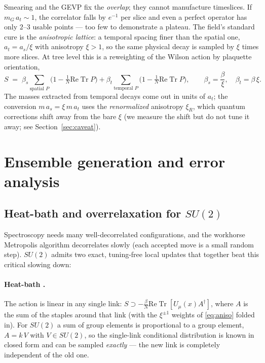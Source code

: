 \documentclass[11pt,a4paper]{article}
\newcommand{\Tr}{\operatorname{Tr}}
\newcommand{\at}{a_t}
\newcommand{\as}{a_s}
\begin{document}
Smearing and the GEVP fix the \emph{overlap}; they cannot manufacture
timeslices. If $m_G\, \at \sim 1$, the correlator falls by $e^{-1}$ per slice
and even a perfect operator has only $2$--$3$ usable points --- too few to
demonstrate a plateau. The field's standard cure
\cite{MorningstarPeardon1999} is the \emph{anisotropic lattice}: a temporal
spacing finer than the spatial one, $\at = \as/\xi$ with anisotropy
$\xi>1$, so the same physical decay is sampled by $\xi$ times more slices.
At tree level this is a reweighting of the Wilson action by plaquette
orientation,
\begin{equation}
  S \;=\; \beta_s \!\!\sum_{\text{spatial } P}\!\!
        \Big(1-\tfrac1N \mathrm{Re}\Tr P\Big)
      + \beta_t \!\!\sum_{\text{temporal } P}\!\!
        \Big(1-\tfrac1N \mathrm{Re}\Tr P\Big),
  \qquad
  \beta_s = \frac{\beta}{\xi},\quad \beta_t = \beta\,\xi .
  \label{eq:aniso}
\end{equation}
The masses extracted from temporal decays come out in units of $\at$; the
conversion $m\,\as = \xi\, m\,\at$ uses the \emph{renormalized} anisotropy
$\xi_R$, which quantum corrections shift away from the bare $\xi$ (we measure
the shift but do not tune it away; see Section~\ref{sec:caveat}).

\section{Ensemble generation and error analysis}
\label{sec:ensemble}

\subsection{Heat-bath and overrelaxation for $SU(2)$}

Spectroscopy needs many well-decorrelated configurations, and the workhorse
Metropolis algorithm decorrelates slowly (each accepted move is a small random
step). $SU(2)$ admits two exact, tuning-free local updates that together beat
this critical slowing down:

\paragraph{Heat-bath \cite{Creutz1980,KennedyPendleton1985}.} The action is
linear in any single link: $S \supset -\tfrac{\beta}{N}\mathrm{Re}\Tr[U_\mu(x) A^\dagger]$,
where $A$ is the sum of the staples around that link (with the $\xi^{\pm1}$
weights of \eqref{eq:aniso} folded in). For $SU(2)$ a sum of group elements is
proportional to a group element, $A = k\,V$ with $V\in SU(2)$, so the
single-link conditional distribution is known in closed form and can be
sampled \emph{exactly} --- the new link is completely independent of the old
one.
\end{document}

